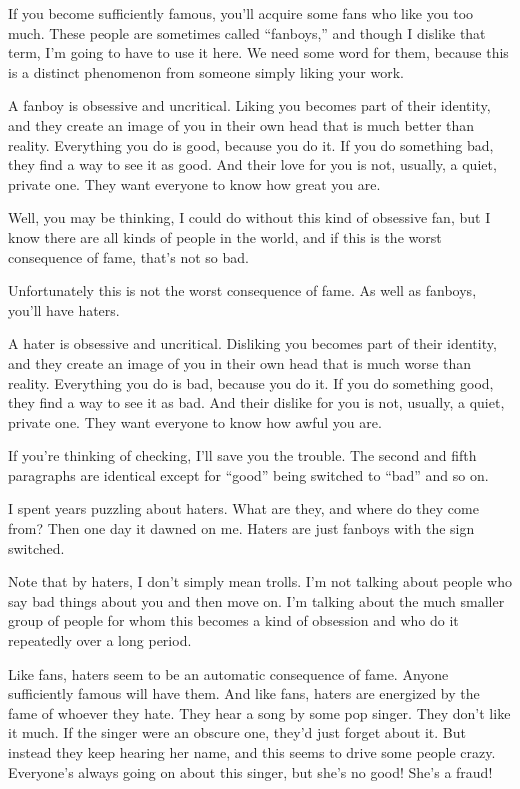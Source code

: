 \documentclass[12pt]{book}
\begin{document}
If you become sufficiently famous, you'll acquire some fans who like you
too much. These people are sometimes called ``fanboys,'' and though I
dislike that term, I'm going to have to use it here. We need some word
for them, because this is a distinct phenomenon from someone simply
liking your work.

A fanboy is obsessive and uncritical. Liking you becomes part of their
identity, and they create an image of you in their own head that is much
better than reality. Everything you do is good, because you do it. If
you do something bad, they find a way to see it as good. And their love
for you is not, usually, a quiet, private one. They want everyone to
know how great you are.

Well, you may be thinking, I could do without this kind of obsessive
fan, but I know there are all kinds of people in the world, and if this
is the worst consequence of fame, that's not so bad.

Unfortunately this is not the worst consequence of fame. As well as
fanboys, you'll have haters.

A hater is obsessive and uncritical. Disliking you becomes part of their
identity, and they create an image of you in their own head that is much
worse than reality. Everything you do is bad, because you do it. If you
do something good, they find a way to see it as bad. And their dislike
for you is not, usually, a quiet, private one. They want everyone to
know how awful you are.

If you're thinking of checking, I'll save you the trouble. The second
and fifth paragraphs are identical except for ``good'' being switched to
``bad'' and so on.

I spent years puzzling about haters. What are they, and where do they
come from? Then one day it dawned on me. Haters are just fanboys with
the sign switched.

Note that by haters, I don't simply mean trolls. I'm not talking about
people who say bad things about you and then move on. I'm talking about
the much smaller group of people for whom this becomes a kind of
obsession and who do it repeatedly over a long period.

Like fans, haters seem to be an automatic consequence of fame. Anyone
sufficiently famous will have them. And like fans, haters are energized
by the fame of whoever they hate. They hear a song by some pop singer.
They don't like it much. If the singer were an obscure one, they'd just
forget about it. But instead they keep hearing her name, and this seems
to drive some people crazy. Everyone's always going on about this
singer, but she's no good! She's a fraud!
\end{document}
